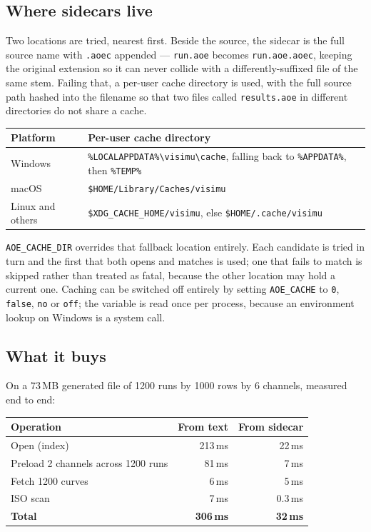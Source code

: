 \documentclass[11pt,a4paper,oneside]{report}
\newcommand{\code}[1]{\texttt{#1}}
\begin{document}
\subsection{Where sidecars live}

Two locations are tried, nearest first. Beside the source, the sidecar is the
full source name with \code{.aoec} appended --- \code{run.aoe} becomes
\code{run.aoe.aoec}, keeping the original extension so it can never collide with
a differently-suffixed file of the same stem. Failing that, a per-user cache
directory is used, with the full source path hashed into the filename so that two
files called \code{results.aoe} in different directories do not share a cache.

\begin{center}
\small
\begin{tabular}{@{}p{}p{}@{}}
\toprule
\textbf{Platform} & \textbf{Per-user cache directory} \\
\midrule
Windows & \code{\%LOCALAPPDATA\%\textbackslash visimu\textbackslash cache}, falling back to \code{\%APPDATA\%}, then \code{\%TEMP\%} \\
macOS & \code{\$HOME/Library/Caches/visimu} \\
Linux and others & \code{\$XDG\_CACHE\_HOME/visimu}, else \code{\$HOME/.cache/visimu} \\
\bottomrule
\end{tabular}
\end{center}

\code{AOE\_CACHE\_DIR} overrides that fallback location entirely. Each candidate
is tried in turn and the first that both opens and matches is used; one that
fails to match is skipped rather than treated as fatal, because the other
location may hold a current one. Caching can be switched off entirely by setting
\code{AOE\_CACHE} to \code{0}, \code{false}, \code{no} or \code{off}; the
variable is read once per process, because an environment lookup on Windows is a
system call.

\subsection{What it buys}

On a 73\,MB generated file of 1200 runs by 1000 rows by 6 channels, measured end
to end:

\begin{center}
\small
\begin{tabular}{@{}lrr@{}}
\toprule
\textbf{Operation} & \textbf{From text} & \textbf{From sidecar} \\
\midrule
Open (index) & 213\,ms & 22\,ms \\
Preload 2 channels across 1200 runs & 81\,ms & 7\,ms \\
Fetch 1200 curves & 6\,ms & 5\,ms \\
ISO scan & 7\,ms & 0.3\,ms \\
\midrule
\textbf{Total} & \textbf{306\,ms} & \textbf{32\,ms} \\
\bottomrule
\end{tabular}
\end{center}
\end{document}
